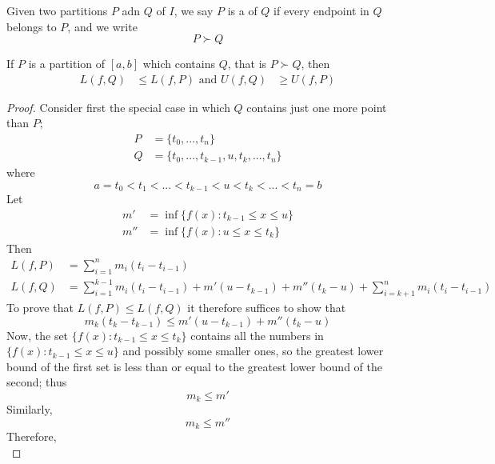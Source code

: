 \begin{definition}
    Given two partitions $P$ adn $Q$ of $I$, we say $P$ is a  of $Q$ if every endpoint in $Q$ belongs to $P$, and we write $$P \succ Q$$
\end{definition}

\begin{lemma}
    If $P$ is a partition of $[a,b]$ which contains $Q$, that is $P \succ Q$, then \begin{align*}
        L(f,Q) &\leq L(f,P) \text{ and } U(f,Q) &\geq U(f,P)
    \end{align*}
\end{lemma}
\begin{proof}
    Consider first the special case in which $Q$ contains just one more point than $P$;\begin{align*}
        P &=\{t_0,...,t_n\} \\
        Q &= \{t_0,...,t_{k-1},u,t_k,...,t_n\}
    \end{align*}
    where $$a= t_0 < t_1 < ... < t_{k-1} < u < t_k < ... < t_n = b$$
    Let \begin{align*}
        m' &= \inf\{f(x):t_{k-1}\leq x \leq u\} \\
        m'' &= \inf\{f(x):u \leq x \leq t_k\}
    \end{align*}
    Then \begin{align*}
        L(f,P) &= \sum\limits_{i=1}^nm_i(t_i - t_{i-1}) \\
        L(f,Q) &= \sum\limits_{i=1}^{k-1}m_i(t_i - t_{i-1}) + m'(u-t_{k-1}) + m''(t_k-u) + \sum\limits_{i=k+1}^nm_i(t_i - t_{i-1})
    \end{align*}
    To prove that $L(f,P) \leq L(f,Q)$ it therefore suffices to show that \begin{equation*}
        m_k(t_k-t_{k-1}) \leq m'(u-t_{k-1}) + m''(t_k-u)
    \end{equation*}
    Now, the set $\{f(x):t_{k-1}\leq x \leq t_k\}$ contains all the numbers in $\{f(x):t_{k-1}\leq x \leq u\}$ and possibly some smaller        ones, so the greatest lower bound of the first set is less than or equal to the greatest lower bound of the second; thus                    \begin{equation*}
        m_k \leq m'
    \end{equation*}
    Similarly, \begin{equation*}
        m_k \leq m''
    \end{equation*}
    Therefore, \begin{equation*}

\end{equation*}
\end{proof}
